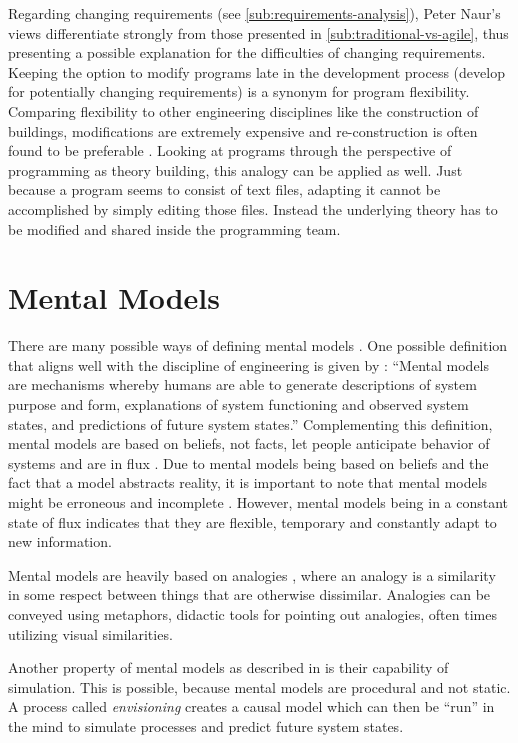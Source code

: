Regarding changing requirements (see \cref{sub:requirements-analysis}), Peter Naur's views differentiate strongly from those presented in \cref{sub:traditional-vs-agile}, thus presenting a possible explanation for the difficulties of changing requirements.
Keeping the option to modify programs late in the development process (develop for potentially changing requirements) is a synonym for program flexibility.
Comparing flexibility to other engineering disciplines like the construction of buildings, modifications are extremely expensive and re-construction is often found to be preferable \autocite{naur_programming_1985}.
Looking at programs through the perspective of programming as theory building, this analogy can be applied as well.
Just because a program seems to consist of text files, adapting it cannot be accomplished by simply editing those files.
Instead the underlying theory has to be modified and shared inside the programming team.


\section{Mental Models}
\label{sec:mental-models}
There are many possible ways of defining mental models \autocite{herczeg_software-ergonomie_2018}.
One possible definition that aligns well with the discipline of engineering is given by \textcite[7]{rouse_looking_1986}: ``Mental models are mechanisms whereby humans are able to generate descriptions of system purpose and form, explanations of system functioning and observed system states, and predictions of future system states.''
Complementing this definition, mental models are based on beliefs, not facts, let people anticipate behavior of systems and are in flux \autocite{dutke_mentale_1994}.
Due to mental models being based on beliefs and the fact that a model abstracts reality, it is important to note that mental models might be erroneous and incomplete \autocite{herczeg_software-ergonomie_2018}.
However, mental models being in a constant state of flux indicates that they are flexible, temporary and constantly adapt to new information.

Mental models are heavily based on analogies \autocite{dutke_mentale_1994}, where an analogy is a similarity in some respect between things that are otherwise dissimilar.
Analogies can be conveyed using metaphors, didactic tools for pointing out analogies, often times utilizing visual similarities.

Another property of mental models as described in \textcite{dutke_mentale_1994} is their capability of simulation.
This is possible, because mental models are procedural and not static.
A process called \emph{envisioning} creates a causal model which can then be ``run'' in the mind to simulate processes and predict future system states.

